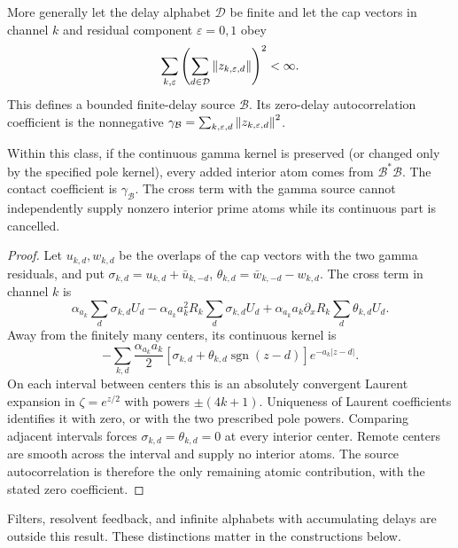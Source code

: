 More generally let the delay alphabet $\mathcal D$ be finite and
let the cap vectors in channel $k$ and residual component
$\varepsilon=0,1$ obey
\[
\sum_{k,\varepsilon}
       \left(\sum_{d\in\mathcal D}\left\lVert z_{k,\varepsilon,d}\right\rVert\right)^2
<\infty .
\]
This defines a bounded finite-delay source $\mathcal B$.
Its zero-delay autocorrelation coefficient is the nonnegative
$\gamma_{\mathcal B}=\sum_{k,\varepsilon,d}
\left\lVert z_{k,\varepsilon,d}\right\rVert^2$.

\begin{proposition}\label{poles:finite-delay}
Within this class, if the continuous gamma kernel is preserved
(or changed only by the specified pole kernel), every added
interior atom comes from $\mathcal B^*\mathcal B$.
The contact coefficient is $\gamma_{\mathcal B}$.
The cross term with the gamma source cannot independently supply
nonzero interior prime atoms while its continuous part is
cancelled.
\end{proposition}
\begin{proof}
Let $u_{k,d},w_{k,d}$ be the overlaps of the cap vectors with the
two gamma residuals, and put
$\sigma_{k,d}=u_{k,d}+\bar u_{k,-d}$,
$\theta_{k,d}=\bar w_{k,-d}-w_{k,d}$.
The cross term in channel $k$ is
\[
\alpha_{a_k}\sum_d\sigma_{k,d}U_d
-\alpha_{a_k}a_k^2R_k\sum_d\sigma_{k,d}U_d
+\alpha_{a_k}a_k\partial_xR_k\sum_d\theta_{k,d}U_d.
\]
Away from the finitely many centers, its continuous kernel is
\[
-\sum_{k,d}\frac{\alpha_{a_k}a_k}{2}
 [\sigma_{k,d}+\theta_{k,d}\operatorname{sgn}(z-d)]
                              e^{-a_k|z-d|}.
\]
On each interval between centers this is an absolutely convergent
Laurent expansion in $\zeta=e^{z/2}$ with powers $\pm(4k+1)$.
Uniqueness of Laurent coefficients identifies it with zero, or
with the two prescribed pole powers. Comparing adjacent intervals
forces $\sigma_{k,d}=\theta_{k,d}=0$ at every interior center.
Remote centers are smooth across the interval and supply no
interior atoms. The source autocorrelation is therefore the only
remaining atomic contribution, with the stated zero coefficient.
\end{proof}
Filters, resolvent feedback, and infinite alphabets with accumulating
delays are outside this result. These distinctions matter in the
constructions below.
